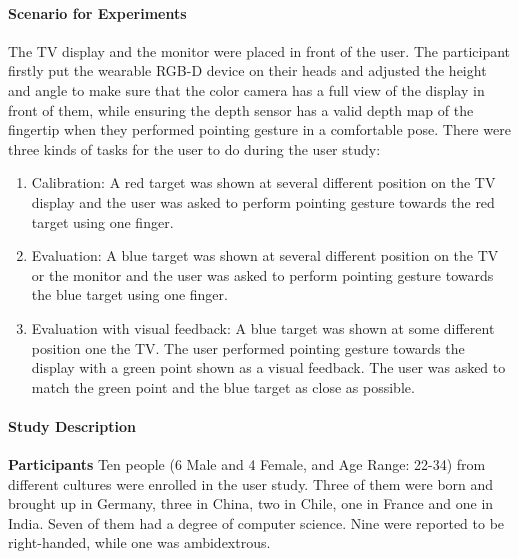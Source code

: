 \paragraph{Scenario for Experiments}
The TV display and the monitor were placed in front of the user. The participant firstly put the wearable RGB-D device on their heads and adjusted the height and angle to make sure that the color camera has a full view of the display in front of them, while ensuring the depth sensor has a valid depth map of the fingertip when they performed pointing gesture in a comfortable pose. There were three kinds of tasks for the user to do during the user study:
\begin{enumerate} [label= (\Alph*)]%
	\item \label{task:calib} Calibration: A red target was shown at several different position on the TV display and the user was asked to perform pointing gesture towards the red target using one finger. 
	\item \label{task:pointEvaluation}Evaluation: A blue target was shown at several different position on the TV or the monitor and the user was asked to perform pointing gesture towards the blue target using one finger.
	\item \label{task:PointWithFeedback}Evaluation with visual feedback: A blue target was shown at some different position one the TV. The user performed pointing gesture towards the display with a green point shown as a visual feedback. The user was asked to match the green point and the blue target as close as possible. 
\end{enumerate}
\paragraph{Study Description}
\textbf{Participants}
Ten people (6 Male and 4 Female, and Age Range: 22-34) from different cultures were enrolled in the user study. Three of them were born and brought up in Germany, three in China, two in Chile, one in France and one in India. Seven of them had a degree of computer science. Nine were reported to be right-handed, while one was ambidextrous.

